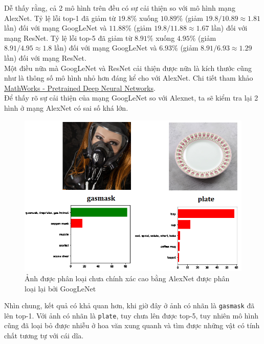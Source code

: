 \documentclass[a4paper]{article}
\begin{document}
\noindent
Dễ thấy rằng, cả 2 mô hình trên đều có sự cải thiện so với mô hình mạng AlexNet. Tỷ lệ lỗi top-1 đã giảm từ $19.8\%$ xuống $10.89\%$ (giảm $19.8/10.89 \approx 1.81$ lần) đối với mạng GoogLeNet và $11.88\%$ (giảm $19.8/11.88 \approx 1.67$ lần) đối với mạng ResNet. Tỷ lệ lỗi top-5 đã giảm từ $8.91\%$ xuống $4.95\%$ (giảm $8.91/4.95 \approx 1.8$ lần) đối với mạng GoogLeNet và $6.93\%$ (giảm $8.91/6.93 \approx 1.29$ lần) đối với mạng ResNet.\\
Một điều nữa mà GoogLeNet và ResNet cải thiện được nữa là kích thước cũng như là thông số mô hình nhỏ hơn đáng kể cho với AlexNet. Chi tiết tham khảo \href{https://www.mathworks.com/help/deeplearning/ug/pretrained-convolutional-neural-networks.html}{MathWorks - Pretrained Deep Neural Networks}.\\
Để thấy rõ sự cải thiện của mạng GoogLeNet so với Alexnet, ta sẽ kiểm tra lại 2 hình ở mạng AlexNet có sai số khá lớn.
\begin{figure}[h!]
\centering
\includegraphics[width=15cm]{images/res3.PNG}
\caption*{Ảnh được phân loại chưa chính xác cao bằng AlexNet được phân loại lại bởi GoogLeNet}
\end{figure}

\noindent
Nhìn chung, kết quả có khả quan hơn, khi giờ đây ở ảnh có nhãn là \texttt{gasmask} đã lên top-1. Với ảnh có nhãn là \texttt{plate}, tuy chưa lên được top-5, tuy nhiên mô hình cũng đã loại bỏ được nhiễu ở hoa văn xung quanh và tìm được những vật có tính chất tương tự với cái dĩa.
\end{document}
